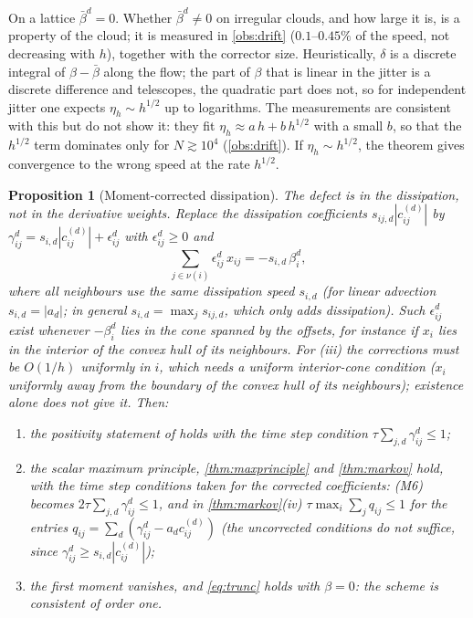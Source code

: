 \documentclass[11pt,a4paper]{article}
\theoremstyle{plain}
\newtheorem{proposition}[theorem]{Proposition}
\theoremstyle{definition}
\theoremstyle{remark}
\numberwithin{equation}{section}
\newcommand{\nb}{\nu}
\newcommand{\A}[1]{\cite[#1]{Addendum}}
\begin{document}
On a lattice $\bar\beta^d=0$. Whether $\bar\beta^d\ne0$ on irregular clouds, and how large it is, is a property of the cloud; it is measured in \cref{obs:drift} ($0.1$--$0.45\%$ of the speed, not decreasing with $h$), together with the corrector size. Heuristically, $\delta$ is a discrete integral of $\beta-\bar\beta$ along the flow; the part of $\beta$ that is linear in the jitter is a discrete difference and telescopes, the quadratic part does not, so for independent jitter one expects $\eta_h\sim h^{1/2}$ up to logarithms. The measurements are consistent with this but do not show it: they fit $\eta_h\approx a\,h+b\,h^{1/2}$ with a small $b$, so that the $h^{1/2}$ term dominates only for $N\gtrsim10^4$ (\cref{obs:drift}). If $\eta_h\sim h^{1/2}$, the theorem gives convergence to the wrong speed at the rate $h^{1/2}$.

\begin{proposition}[Moment-corrected dissipation]\label{prop:moment}
The defect is in the dissipation, not in the derivative weights. Replace the dissipation coefficients $s_{ij,d}|c^{(d)}_{ij}|$ by $\gamma^{d}_{ij}=s_{i,d}|c^{(d)}_{ij}|+\epsilon^{d}_{ij}$ with $\epsilon^d_{ij}\ge0$ and
\[
\sum_{j\in\nb(i)}\epsilon^{d}_{ij}\,x_{ij}=-s_{i,d}\,\beta^{d}_i ,
\]
where all neighbours use the same dissipation speed $s_{i,d}$ (for linear advection $s_{i,d}=|a_d|$; in general $s_{i,d}=\max_js_{ij,d}$, which only adds dissipation). Such $\epsilon^d_{ij}$ exist whenever $-\beta^d_i$ lies in the cone spanned by the offsets, for instance if $x_i$ lies in the interior of the convex hull of its neighbours. For (iii) the corrections must be $O(1/h)$ uniformly in $i$, which needs a uniform interior-cone condition ($x_i$ uniformly away from the boundary of the convex hull of its neighbours); existence alone does not give it. Then:
\begin{enumerate}[label=(\roman*)]
\item the positivity statement of \A{Prop.~5.2} holds with the time step condition $\tau\sum_{j,d}\gamma^{d}_{ij}\le1$;
\item the scalar maximum principle, \cref{thm:maxprinciple} and \cref{thm:markov} hold, with the time step conditions taken for the corrected coefficients: (M6) becomes $2\tau\sum_{j,d}\gamma^d_{ij}\le1$, and in \cref{thm:markov}(iv) $\tau\max_i\sum_jq_{ij}\le1$ for the entries $q_{ij}=\sum_d(\gamma^d_{ij}-a_dc^{(d)}_{ij})$ (the uncorrected conditions do not suffice, since $\gamma^d_{ij}\ge s_{i,d}|c^{(d)}_{ij}|$);
\item the first moment vanishes, and \eqref{eq:trunc} holds with $\beta=0$: the scheme is consistent of order one.
\end{enumerate}
\end{proposition}
\end{document}
